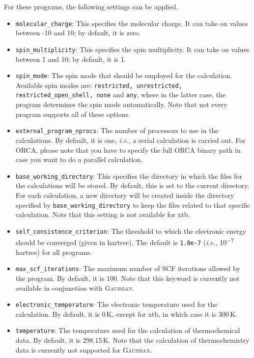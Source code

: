 \documentclass[]{tufte-book}
\begin{document}
For these programs, the following settings can be applied.
\begin{itemize}
\item \texttt{molecular\_charge}: This specifies the molecular charge. It can take on values between -10 and 10; by default,
it is zero.
\item \texttt{spin\_multiplicity}: This specifies the spin multiplicity. It can take on values between 1 and 10; by default,
it is 1.
\item \texttt{spin\_mode}: The spin mode that should be employed for the calculation. Available spin modes are: \texttt{restricted, unrestricted, restricted\_open\_shell, none} and \texttt{any}, where in the latter case, the program determines the spin mode automatically. Note that not every program supports all of these options.
\item \texttt{external\_program\_nprocs}: The number of processors to use in the calculations. By default, it is one, \textit{i.e.},
a serial calculation is carried out. For \textsc{ORCA}, please note that you have to specify the full \textsc{ORCA} binary path in case you want to do a parallel calculation.
\item \texttt{base\_working\_directory}: This specifies the directory in which the files for the calculations will
be stored. By default, this is set to the current directory. For each calculation, a new directory will be
created inside the directory specified by \texttt{base\_working\_directory} to keep the files related to that specific
calculation. Note that this setting is not available for xtb.
\item \texttt{self\_consistence\_criterion}: The threshold to which the electronic energy should be converged (given in
hartree). The default is \texttt{1.0e-7} (\textit{i.e.}, 10\textsuperscript{$-$7}\,hartree) for all programs.
\item \texttt{max\_scf\_iterations}: The maximum number of SCF iterations allowed by the program. By default, it is 100. Note that this keyword is currently not available in conjunction with \textsc{Gaussian}.
\item \texttt{electronic\_temperature}: The electronic temperature used for the calculation. By default, it is 0\,K, except for xtb, in which case it is 300\,K.
\item \texttt{temperature}: The temperature used for the calculation of thermochemical data. By default, it is 298.15\,K. Note that the calculation of thermochemistry data is currently not supported for \textsc{Gaussian}.
\end{itemize}
\end{document}
